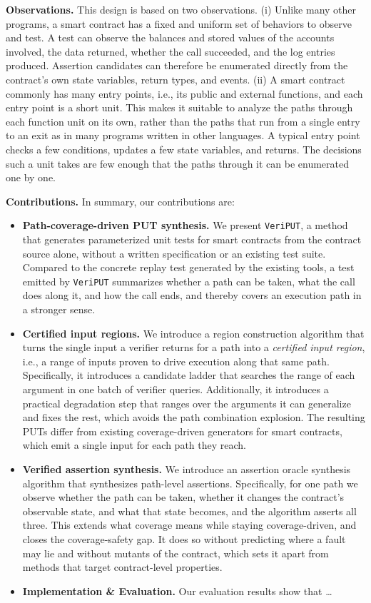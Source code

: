 \documentclass[manuscript,anonymous]{acmart}
\newcommand{\tool}[1]{\texttt{#1}}
\begin{document}
\textbf{Observations.} This design is based on two observations. (i) Unlike many
other programs, a smart contract has a fixed and uniform set of behaviors to
observe and test. A test can observe the balances and stored values of the
accounts involved, the data returned, whether the call succeeded, and the log
entries produced. Assertion candidates can therefore be enumerated directly from
the contract's own state variables, return types, and events. (ii) A smart
contract commonly has many entry points, i.e., its public and external
functions, and each entry point is a short unit. This makes it suitable to
analyze the paths through each function unit on its own, rather than the paths
that run from a single entry to an exit as in many programs written in other
languages. A typical entry point checks a few conditions, updates a few state
variables, and returns. The decisions such a unit takes are few enough that the
paths through it can be enumerated one by one.

\textbf{Contributions.}
In summary, our contributions are:
\begin{itemize}
\item \textbf{Path-coverage-driven PUT synthesis.}
We present \tool{VeriPUT}, a method that generates parameterized unit tests for
smart contracts from the contract source alone, without a written specification
or an existing test suite. Compared to the concrete replay test generated by the
existing tools, a test emitted by \tool{VeriPUT} summarizes whether a path can
be taken, what the call does along it, and how the call ends, and thereby covers
an execution path in a stronger sense.

\item \textbf{Certified input regions.}
We introduce a region construction algorithm that turns the single input a
verifier returns for a path into a \emph{certified input region}, i.e., a range
of inputs proven to drive execution along that same path. Specifically, it
introduces a candidate ladder that searches the range of each argument in one
batch of verifier queries. Additionally, it introduces a practical degradation step that ranges over the
arguments it can generalize and fixes the rest, which avoids the path
combination explosion. The
resulting PUTs differ from existing coverage-driven generators for smart
contracts, which emit a single input for each path they reach.


\item \textbf{Verified assertion synthesis.}
We introduce an assertion oracle synthesis algorithm that synthesizes
path-level assertions. Specifically, for one path we observe whether the path
can be taken, whether it changes the contract's observable state, and what that
state becomes, and the algorithm asserts all three. This extends what coverage
means while staying coverage-driven, and closes the coverage-safety gap. It does
so without predicting where a fault may lie and without mutants of the contract,
which sets it apart from methods that target contract-level properties.

\item \textbf{Implementation \& Evaluation.}
Our evaluation results show that \dots

\end{itemize}
\end{document}

